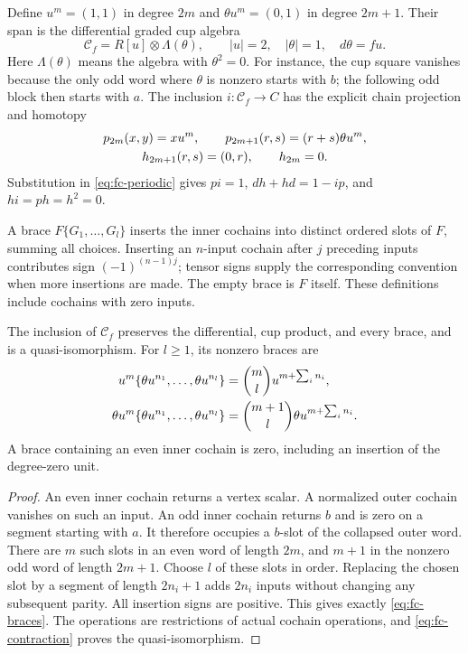 Define \(u^m=(1,1)\) in degree \(2m\) and
\(\theta u^m=(0,1)\) in degree \(2m+1\). Their span is the
differential graded cup algebra
\begin{equation}\label{eq:fc-small}
 \mathcal C_f=R[u]\otimes\Lambda(\theta),\qquad
 |u|=2,\quad |\theta|=1,\quad d\theta=fu.
\end{equation}
Here \(\Lambda(\theta)\) means the algebra with \(\theta^2=0\).
For instance, the cup square vanishes because the only odd word where
\(\theta\) is nonzero starts with \(b\); the following odd block
then starts with \(a\). The inclusion \(i:\mathcal C_f\to C\)
has the explicit chain projection and homotopy
\begin{gather}\label{eq:fc-contraction}
 p_{2m}(x,y)=xu^m,\qquad p_{2m+1}(r,s)=(r+s)\theta u^m,\\
 h_{2m+1}(r,s)=(0,r),\qquad h_{2m}=0.\notag
\end{gather}
Substitution in \eqref{eq:fc-periodic} gives
\(pi=1\), \(dh+hd=1-ip\), and \(hi=ph=h^2=0\).

A brace \(F\{G_1,\ldots,G_l\}\) inserts the inner cochains into
distinct ordered slots of \(F\), summing all choices. Inserting an
\(n\)-input cochain after \(j\) preceding inputs contributes sign
\((-1)^{(n-1)j}\); tensor signs supply the corresponding convention
when more insertions are made. The empty brace is \(F\) itself.
These definitions include cochains with zero inputs.

\begin{theorem}\label{thm:fc-braces}
The inclusion of \(\mathcal C_f\) preserves the differential, cup
product, and every brace, and is a quasi-isomorphism. For \(l\geq1\),
its nonzero braces are
\begin{align}
 u^m\{\theta u^{n_1},\ldots,\theta u^{n_l}\}
 &=\binom ml u^{m+\sum_i n_i},\label{eq:fc-braces}\\
 \theta u^m\{\theta u^{n_1},\ldots,\theta u^{n_l}\}
 &=\binom{m+1}{l}\theta u^{m+\sum_i n_i}.\notag
\end{align}
A brace containing an even inner cochain is zero, including an
insertion of the degree-zero unit.
\end{theorem}
\begin{proof}
An even inner cochain returns a vertex scalar. A normalized outer
cochain vanishes on such an input. An odd inner cochain returns \(b\)
and is zero on a segment starting with \(a\). It therefore occupies
a \(b\)-slot of the collapsed outer word. There are \(m\) such
slots in an even word of length \(2m\), and \(m+1\) in the nonzero
odd word of length \(2m+1\). Choose \(l\) of these slots in order.
Replacing the chosen slot by a segment of length \(2n_i+1\) adds
\(2n_i\) inputs without changing any subsequent parity. All insertion
signs are positive. This gives exactly \eqref{eq:fc-braces}.
The operations are restrictions of actual cochain operations, and
\eqref{eq:fc-contraction} proves the quasi-isomorphism.
\end{proof}

